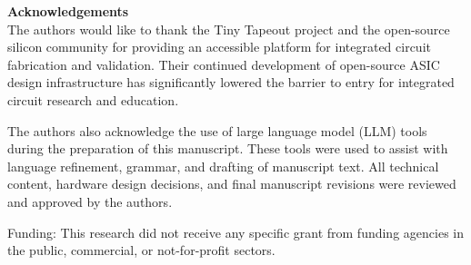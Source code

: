 \textbf{Acknowledgements}\\

The authors would like to thank the Tiny Tapeout project and the open-source silicon community for providing an accessible platform for integrated circuit fabrication and validation. Their continued development of open-source ASIC design infrastructure has significantly lowered the barrier to entry for integrated circuit research and education.

The authors also acknowledge the use of large language model (LLM) tools during the preparation of this manuscript. These tools were used to assist with language refinement, grammar, and drafting of manuscript text. All technical content, hardware design decisions, and final manuscript revisions were reviewed and approved by the authors.

Funding: This research did not receive any specific grant from funding agencies in the public, commercial, or not-for-profit sectors.